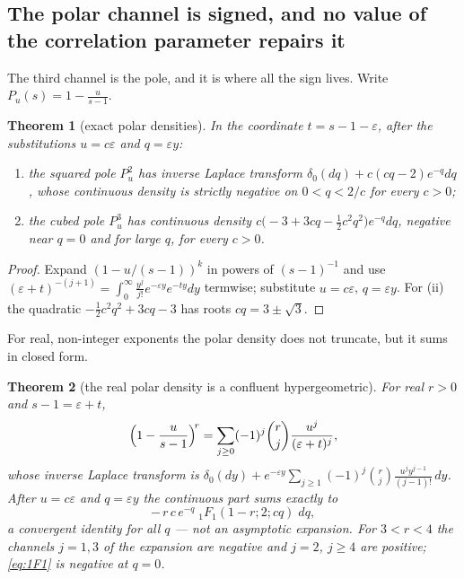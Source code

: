 \documentclass[11pt]{amsart}
\newtheorem{theorem}{Theorem}[section]
\theoremstyle{definition}
\theoremstyle{remark}
\theoremstyle{definition}
\newcommand{\eps}{\varepsilon}
\begin{document}
\subsection{The polar channel is signed, and no value of the correlation parameter repairs it}
\label{sec:polar}

The third channel is the pole, and it is where all the sign lives. Write
$P_u(s)=1-\tfrac{u}{s-1}$.

\begin{theorem}[exact polar densities]\label{thm:polar}
In the coordinate $t=s-1-\eps$, after the substitutions $u=c\eps$ and $q=\eps y$:
\begin{enumerate}[label=\textup{(\roman*)},leftmargin=*]
\item the squared pole $P_u^2$ has inverse Laplace transform
      $\delta_0(dq)+c(cq-2)e^{-q}dq$, whose continuous density is strictly negative on
      $0<q<2/c$ for \emph{every} $c>0$;
\item the cubed pole $P_u^3$ has continuous density
      $c\bigl(-3+3cq-\tfrac12c^2q^2\bigr)e^{-q}dq$, negative near $q=0$ and for large $q$, for
      every $c>0$.
\end{enumerate}
\end{theorem}

\begin{proof}
Expand $(1-u/(s-1))^k$ in powers of $(s-1)^{-1}$ and use
$(\eps+t)^{-(j+1)}=\int_0^\infty\tfrac{y^j}{j!}e^{-\eps y}e^{-ty}dy$ termwise; substitute
$u=c\eps$, $q=\eps y$. For (ii) the quadratic $-\tfrac12c^2q^2+3cq-3$ has roots
$cq=3\pm\sqrt3$.
\end{proof}

For real, non-integer exponents the polar density does not truncate, but it sums in closed form.

\begin{theorem}[the real polar density is a confluent hypergeometric]
\label{thm:polar-1F1}
For real $r>0$ and $s-1=\eps+t$,
\[
   \Bigl(1-\frac{u}{s-1}\Bigr)^{\!r}
   =\sum_{j\ge0}(-1)^j\binom rj\frac{u^j}{(\eps+t)^j},
\]
whose inverse Laplace transform is
$\delta_0(dy)+e^{-\eps y}\sum_{j\ge1}(-1)^j\binom rj\frac{u^jy^{j-1}}{(j-1)!}\,dy$. After
$u=c\eps$ and $q=\eps y$ the continuous part sums exactly to
\begin{equation}\label{eq:1F1}
   -\,r\,c\,e^{-q}\;{}_1F_1(1-r;2;cq)\;dq ,
\end{equation}
a convergent identity for all $q$ --- not an asymptotic expansion. For $3<r<4$ the channels
$j=1,3$ of the expansion are negative and $j=2$, $j\ge4$ are positive; \eqref{eq:1F1} is
negative at $q=0$.
\end{theorem}
\end{document}
